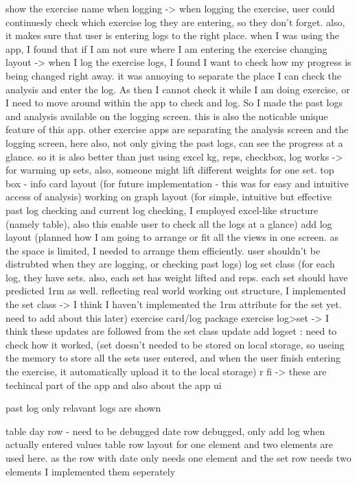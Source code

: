 show the exercise name when logging -> when logging the exercise, user could continuesly check which exercise log they are entering, so they don't forget. also, it makes sure that user is entering logs to the right place. when I was using the app, I found that if I am not sure where I am entering the exercise
changing layout -> when I log the exercise logs, I found I want to check how my progress is being changed right away. it was annoying to separate the place I can check the analysis and enter the log. As then I cannot check it while I am doing exercise, or I need to move around within the app to check and log. So I made the past logs and analysis available on the logging screen. this is also the noticable unique feature of this app. other exercise apps are separating the analysis screen and the logging screen, here also, not only giving the past logs, can see the progress at a glance. so it is also better than just using excel
kg, reps, checkbox, log works -> for warming up sets, also, someone might lift different weights for one set. 
top box - info card layout (for future implementation - this was for easy and intuitive access of analysis)
working on graph layout (for simple, intuitive but effective past log checking and current log checking, I employed excel-like structure (namely table), also this enable user to check all the logs at a glance)
add log layout (planned how I am going to arrange or fit all the views in one screen. as the space is limited, I needed to arrange them efficiently. user shouldn't be distrubted when they are logging, or checking past logs)
log set class (for each log, they have sets. also, each set has weight lifted and reps. each set should have predicted 1rm as well. reflecting real world working out structure, I implemented the set class -> I think I haven't implemented the 1rm attribute for the set yet. need to add about this later)
    exercise card/log package
    exercise log>set
        -> I think these updates are followed from the set class update 
add logset \todo : need to check how it worked, (set doesn't needed to be stored on local storage, so useing the memory to store all the sets user entered, and when the user finish entering the exercise, it automatically upload it to the local storage)
r fi
    -> these are techincal part of the app
    and also about the app ui 

past log
only relavant logs are shown

table day row - need to be debugged
date row debugged, only add log when actually entered values
    table row layout for one element and two elements are used here.
    as the row with date only needs one element 
    and the set row needs two elements
    I implemented them seperately

